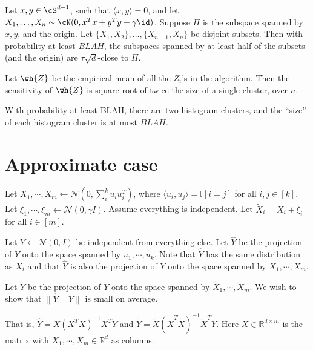 \begin{corollary}
    Let $x,y \in \cS^{d-1}$, such that $\langle x,y \rangle = 0$,
    and let $X_1,\dots,X_n \sim \cN(0,x^Tx + y^Ty + \gamma \id)$.
    Suppose $\Pi$ is the subspace spanned by $x,y$, and the origin.
    Let $\{X_1,X_2\},\dots,\{X_{n-1},X_n\}$ be disjoint subsets.
    Then with probability at least $BLAH$, the subspaces spanned
    by at least half of the subsets (and the origin) are
    $\tau\sqrt{d}$-close to $\Pi$.
\end{corollary}

\begin{lemma}
    Let $\wh{Z}$ be the empirical mean of all the $Z_i$'s in the
    algorithm. Then the sensitivity of $\wh{Z}$ is
    square root of twice the size of a single cluster, over $n$.
\end{lemma}

\begin{lemma}
    With probability at least BLAH, there are two histogram clusters, and the ``size'' of each histogram cluster is at most $BLAH$.
\end{lemma}

\section{Approximate case}

Let $X_1, \cdots, X_m \gets \mathcal{N}(0,\sum_i^k u_i u_i^T)$, where $\langle u_i, u_j \rangle = \mathbb{I}[i=j]$ for all $i,j \in [k]$. Let $\xi_1, \cdots, \xi_m \gets \mathcal{N}(0,\gamma I)$. Assume everything is independent. Let $\tilde{X}_i = X_i + \xi_i$ for all $i \in [m]$.

Let $Y \gets \mathcal{N}(0,I)$ be independent from everything else. Let $\hat{Y}$ be the projection of $Y$ onto the space spanned by $u_1, \cdots, u_k$. Note that $\hat Y$ has the same distribution as $X_i$ and that $\hat Y$ is also the projection of $Y$ onto the space spanned by $X_1, \cdots, X_m$. 

Let $\tilde Y$ be the projection of $Y$ onto the space spanned by $\tilde{X}_1, \cdots, \tilde{X}_m$. We wish to show that $\|\hat{Y} - \tilde{Y}\|$ is small on average.



That is, $\hat Y = X(X^TX)^{-1}X^TY$ and $\tilde Y = \tilde{X}(\tilde{X}^T\tilde{X})^{-1}\tilde{X}^TY$. Here $X \in \mathbb{R}^{d \times m}$ is the matrix with $X_1, \cdots, X_m \in \mathbb{R}^d$ as columns.

